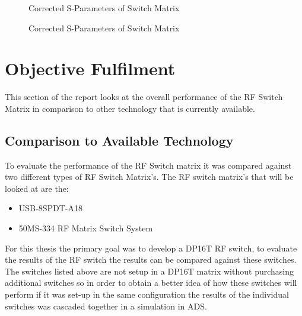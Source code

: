 \documentclass[12pt,openany,a4paper]{book}
\begin{document}
\begin{figure}[H]
	\centering
	\caption{Corrected S-Parameters of Switch Matrix}
	\label{fig:corrected-switchmatrix-insertion}
\end{figure}  
\begin{figure}[H]
	\centering
	\caption{Corrected S-Parameters of Switch Matrix}
	\label{fig:corrected-switchmatrix-isolation}
\end{figure} 







\section{Objective Fulfilment}
This section of the report looks at the overall performance of the RF Switch Matrix in comparison to other technology that is currently available. 

\subsection{Comparison to Available Technology} \label{sec:othertech}
To evaluate the performance of the RF Switch matrix it was compared against two different types of RF Switch Matrix's. The RF switch matrix's that will be looked at are the:
\begin{itemize}
	\setlength\itemsep{-0.5em}
	\item USB-8SPDT-A18
	\item 50MS-334 RF Matrix Switch System
\end{itemize}
For this thesis the primary goal was to develop a DP16T RF switch, to evaluate the results of the RF switch the results can be compared against these switches. The switches listed above are not setup in a DP16T matrix without purchasing additional switches so in order to obtain a better idea of how these switches will perform if it was set-up in the same configuration the results of the individual switches was cascaded together in a simulation in ADS.
\end{document}
